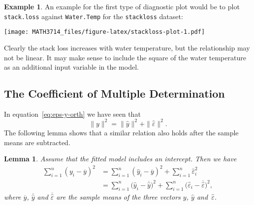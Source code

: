 \documentclass[
  a4paper,
]{article}
\newenvironment{Shaded}{\begin{snugshade}}{\end{snugshade}}
\newcommand{\AttributeTok}[1]{\textcolor[rgb]{0.77,0.63,0.00}{#1}}
\newcommand{\FunctionTok}[1]{\textcolor[rgb]{0.00,0.00,0.00}{#1}}
\newcommand{\NormalTok}[1]{#1}
\newcommand{\SpecialCharTok}[1]{\textcolor[rgb]{0.00,0.00,0.00}{#1}}
\newcommand{\StringTok}[1]{\textcolor[rgb]{0.31,0.60,0.02}{#1}}
\newtheorem{lemma}{Lemma}[section]
\theoremstyle{definition}
\theoremstyle{definition}
\newtheorem{example}{Example}[section]
\theoremstyle{definition}
\theoremstyle{definition}
\theoremstyle{remark}
\begin{document}
\begin{example}
\protect\hypertarget{exm:stackloss-plot}{}\label{exm:stackloss-plot}An example for the first type of diagnostic plot would be to
plot \texttt{stack.loss} against \texttt{Water.Temp} for the \texttt{stackloss} dataset:

\begin{Shaded}
\end{Shaded}

\texttt{[image: MATH3714\_files/figure-latex/stackloss-plot-1.pdf]}

Clearly the stack loss increases with water temperature, but the
relationship may not be linear. It may make sense to include
the square of the water temperature as an additional input variable
in the model.
\end{example}

\hypertarget{R-squared}{%
\subsection{The Coefficient of Multiple Determination}\label{R-squared}}

In equation~\eqref{eq:eps-y-orth} we have seen that
\begin{equation*}
  \|y\|^2
  = \|\hat y\|^2 + \|\hat\varepsilon\|^2.
\end{equation*}
The following lemma shows that a similar relation also holds after the sample
means are subtracted.

\begin{lemma}
\protect\hypertarget{lem:explained-variance}{}\label{lem:explained-variance}Assume that the fitted model includes an intercept. Then we have
\begin{align*}
  \sum_{i=1}^n (y_i - \overline{y})^2
  &= \sum_{i=1}^n (\hat y_i - \overline{y})^2
    + \sum_{i=1}^n \hat \varepsilon_i^2 \\
  &= \sum_{i=1}^n \bigl( \hat y_i - \overline{\hat y} \bigr)^2
    + \sum_{i=1}^n \bigl( \hat \varepsilon_i - \overline{\hat\varepsilon} \bigr)^2,
\end{align*}
where \(\overline{y}\), \(\overline{\hat y}\) and \(\overline{\hat\varepsilon}\)
are the sample means of the three vectors \(y\), \(\hat y\) and~\(\hat\varepsilon\).
\end{lemma}
\end{document}
